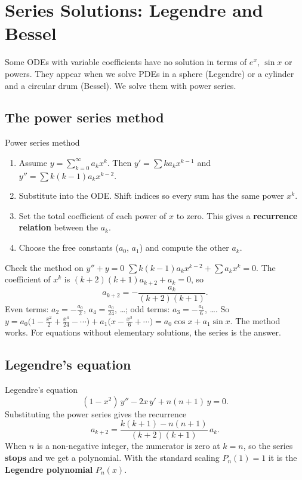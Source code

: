\chapter{Series Solutions: Legendre and Bessel}

Some ODEs with variable coefficients have no solution in terms of $e^x$, $\sin x$ or powers. They appear when we solve PDEs in a sphere (Legendre) or a cylinder and a circular drum (Bessel). We solve them with power series.

\section{The power series method}

\begin{methodbox}{Power series method}
\begin{enumerate}
  \item Assume $y = \sum_{k=0}^\infty a_kx^k$. Then $y' = \sum ka_kx^{k-1}$ and $y'' = \sum k(k-1)a_kx^{k-2}$.
  \item Substitute into the ODE. Shift indices so every sum has the same power $x^k$.
  \item Set the total coefficient of each power of $x$ to zero. This gives a \textbf{recurrence relation} between the $a_k$.
  \item Choose the free constants ($a_0$, $a_1$) and compute the other $a_k$.
\end{enumerate}
\end{methodbox}

\begin{examplebox}{Check the method on $y''+y=0$}
$\sum k(k-1)a_kx^{k-2} + \sum a_kx^k = 0$. The coefficient of $x^k$ is $(k+2)(k+1)a_{k+2} + a_k = 0$, so
\[ a_{k+2} = -\frac{a_k}{(k+2)(k+1)}. \]
Even terms: $a_2 = -\frac{a_0}{2}$, $a_4 = \frac{a_0}{24}$, \dots; odd terms: $a_3 = -\frac{a_1}{6}$, \dots. So $y = a_0\big(1 - \frac{x^2}{2} + \frac{x^4}{24} - \cdots\big) + a_1\big(x - \frac{x^3}{6} + \cdots\big) = a_0\cos x + a_1\sin x$. The method works. For equations without elementary solutions, the series is the answer.
\end{examplebox}

\section{Legendre's equation}

\begin{defbox}{Legendre's equation}
\[ (1-x^2)\,y'' - 2x\,y' + n(n+1)\,y = 0 . \]
Substituting the power series gives the recurrence
\[ a_{k+2} = \frac{k(k+1) - n(n+1)}{(k+2)(k+1)}\,a_k . \]
When $n$ is a non-negative integer, the numerator is zero at $k=n$, so the series \textbf{stops} and we get a polynomial. With the standard scaling $P_n(1) = 1$ it is the \textbf{Legendre polynomial} $P_n(x)$.
\end{defbox}

